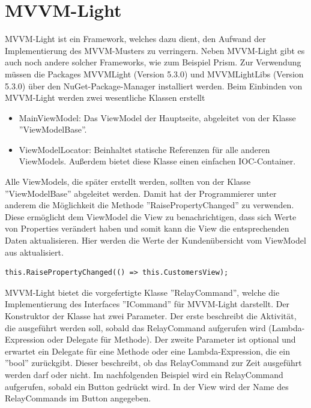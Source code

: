 \section{MVVM-Light}
MVVM-Light ist ein Framework, welches dazu dient, den Aufwand der Implementierung des MVVM-Musters zu verringern. Neben MVVM-Light gibt es auch noch andere solcher Frameworks, wie zum Beispiel Prism. \newline Zur Verwendung müssen die Packages MVVMLight (Version 5.3.0) und MVVMLightLibs (Version 5.3.0) über den NuGet-Package-Manager installiert werden. \newline Beim Einbinden von MVVM-Light werden zwei wesentliche Klassen erstellt
\begin{itemize}
\item MainViewModel: Das ViewModel der Hauptseite, abgeleitet von der Klasse ''ViewModelBase''.
\item ViewModelLocator: Beinhaltet statische Referenzen für alle anderen ViewModels. Außerdem bietet diese Klasse einen einfachen IOC-Container.
\end{itemize}
Alle ViewModels, die später erstellt werden, sollten von der Klasse ''ViewModelBase'' abgeleitet werden. Damit hat der Programmierer unter anderem die Möglichkeit die Methode ''RaisePropertyChanged'' zu verwenden. Diese ermöglicht dem ViewModel die View zu benachrichtigen, dass sich Werte von Properties verändert haben und somit kann die View die entsprechenden Daten aktualisieren. \newline
Hier werden die Werte der Kundenübersicht vom ViewModel aus aktualisiert.
\begin{lstlisting}
this.RaisePropertyChanged(() => this.CustomersView);
\end{lstlisting}
MVVM-Light bietet die vorgefertigte Klasse ''RelayCommand'', welche die Implementierung des Interfaces ''ICommand'' für MVVM-Light darstellt. Der Konstruktor der Klasse hat zwei Parameter. Der erste beschreibt die Aktivität, die ausgeführt werden soll, sobald das RelayCommand aufgerufen wird (Lambda-Expression oder Delegate für Methode). Der zweite Parameter ist optional und erwartet ein Delegate für eine Methode oder eine Lambda-Expression, die ein ''bool'' zurückgibt. Dieser  beschreibt, ob das RelayCommand zur Zeit ausgeführt werden darf oder nicht.
\newline 
Im nachfolgenden Beispiel wird ein RelayCommand aufgerufen, sobald ein Button gedrückt wird.
\newline In der View wird der Name des RelayCommands im Button angegeben.
